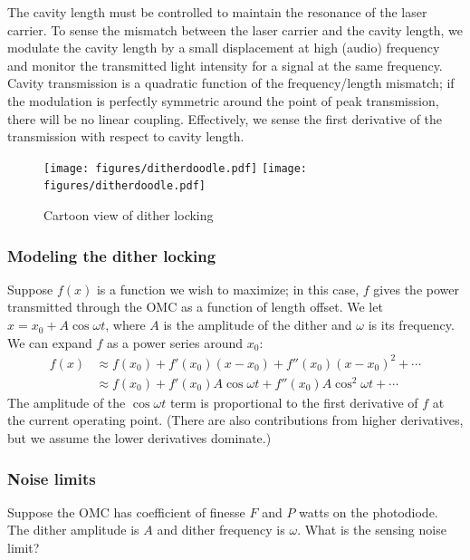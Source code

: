 
The cavity length must be controlled to maintain the resonance of the
laser carrier.  To sense the mismatch between the laser carrier and
the cavity length, we modulate the cavity length by a small
displacement at high (audio) frequency and monitor the transmitted light
intensity for a signal at the same frequency.  Cavity transmission is
a quadratic function of the frequency/length mismatch; if the
modulation is perfectly symmetric around the point of peak
transmission, there will be no linear coupling.  Effectively, we sense
the first derivative of the transmission with respect to cavity
length.  

\begin{figure}[t]
\centerline{\texttt{[image: figures/ditherdoodle.pdf]}
\hfill
\texttt{[image: figures/ditherdoodle.pdf]}}
\caption{\label{fig:dither-doodle}Cartoon view of dither locking}
\end{figure}

\subsubsection{Modeling the dither locking}

Suppose $f(x)$ is a function we wish to maximize; in this case, $f$
gives the power transmitted through the OMC as a function of length
offset.  We let $x = x_0 + A \cos\omega t$, where $A$ is the amplitude
of the dither and $\omega$ is its frequency.  We can expand $f$ as a
power series around $x_0$: 
\begin{align}
f(x) &\approx f(x_0) + f'(x_0)\left(x - x_0\right) + f''(x_0)\left(x-x_0\right)^2 + \cdots \\
     &\approx f(x_0) + f'(x_0)A\cos\omega t        + f''(x_0)A\cos^2\omega t + \cdots
\end{align}
%
The amplitude of the $\cos\omega t$ term is proportional to the first
derivative of $f$ at the current operating point.  (There are also
contributions from higher derivatives, but we assume the lower
derivatives dominate.)

\subsubsection{Noise limits}

Suppose the OMC has coefficient of finesse $F$ and $P$ watts on the
photodiode.  The dither amplitude is $A$ and dither frequency is
$\omega$.  What is the sensing noise limit?

